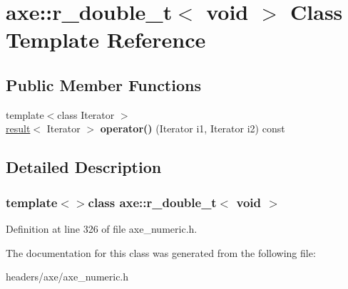 \hypertarget{classaxe_1_1r__double__t_3_01void_01_4}{\section{axe\+:\+:r\+\_\+double\+\_\+t$<$ void $>$ Class Template Reference}
\label{classaxe_1_1r__double__t_3_01void_01_4}
}
\subsection*{Public Member Functions}
\begin{DoxyCompactItemize}
\item 
\hypertarget{classaxe_1_1r__double__t_3_01void_01_4_a6cff2cdd6e92a39de6ed115b41b3f4f8}{{\footnotesize template$<$class Iterator $>$ }\\\hyperlink{structaxe_1_1result}{result}$<$ Iterator $>$ {\bfseries operator()} (Iterator i1, Iterator i2) const }\label{classaxe_1_1r__double__t_3_01void_01_4_a6cff2cdd6e92a39de6ed115b41b3f4f8}

\end{DoxyCompactItemize}


\subsection{Detailed Description}
\subsubsection*{template$<$$>$class axe\+::r\+\_\+double\+\_\+t$<$ void $>$}



Definition at line 326 of file axe\+\_\+numeric.\+h.



The documentation for this class was generated from the following file\+:\begin{DoxyCompactItemize}
\item 
headers/axe/axe\+\_\+numeric.\+h\end{DoxyCompactItemize}
